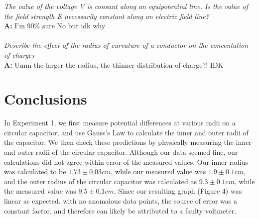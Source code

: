 \documentclass[letterpaper]{article}
\begin{document}
\textit{The value of the voltage V is consant along an equipotential line.
Is the value of the field strength E necessarily constant along an electric field line?}\\
\textbf{A:}
I'm 90\% sure No but idk why \\ \\
\textit{Describe the effect of the radius of curvature of a conductor on the concentation of charges}\\
\textbf{A:}
Umm the larger the radius, the thinner distribution of charge?! IDK
\section{Conclusions}
In Experiment 1, we first measure potential differences at various radii on a circular capacitor,
and use Gauss's Law to calculate the inner and outer radii of the capacitor. We then check these predictions
by physically measuring the inner and outer radii of the circular capacitor. Although our data seemed
fine, our calculations did not agree within error of the measured values. Our inner radius was calculated to be
$1.73 \pm 0.03 cm$, while our measured value was $1.9 \pm 0.1 cm$, and the outer radius of the circular capacitor
was calculated as $9.3 \pm 0.1 cm$, while the measured value was $9.5 \pm 0.1 cm$. Since our resulting graph (Figure 4)
was linear as expected. with no anomalous data points, the source of error was a constant factor, and therefore can
likely be attributed to a faulty voltmeter.
\end{document}
